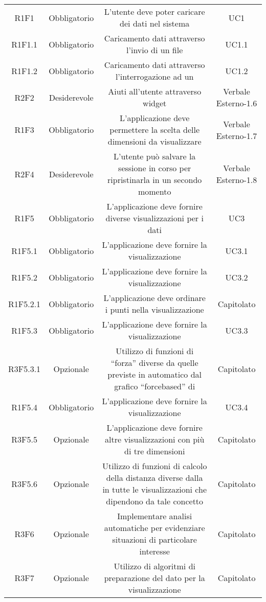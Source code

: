 \begin{center}
\begin{longtable}{C{\colA} C{\colB} C{\colC} C{\colA}}
R1F1 & Obbligatorio & L'utente deve poter caricare dei dati nel sistema & UC1\\
R1F1.1 & Obbligatorio & Caricamento dati attraverso l'invio di un file  & UC1.1\\
R1F1.2 & Obbligatorio & Caricamento dati attraverso l'interrogazione ad un  & UC1.2\\
R2F2 & Desiderevole & Aiuti all'utente attraverso widget & Verbale Esterno-1.6 \\
R1F3 & Obbligatorio & L'applicazione deve permettere la scelta delle dimensioni da visualizzare & Verbale Esterno-1.7\\
R2F4 & Desiderevole & L'utente può salvare la sessione in corso per ripristinarla in un secondo momento & Verbale Esterno-1.8\\
R1F5 & Obbligatorio & L'applicazione deve fornire diverse visualizzazioni per i dati & UC3\\
R1F5.1 & Obbligatorio & L'applicazione deve fornire la visualizzazione  & UC3.1\\
R1F5.2 & Obbligatorio & L'applicazione deve fornire la visualizzazione  & UC3.2\\
R1F5.2.1 & Obbligatorio & L'applicazione deve ordinare i punti nella visualizzazione  & Capitolato \\
R1F5.3 & Obbligatorio & L'applicazione deve fornire la visualizzazione  & UC3.3\\
R3F5.3.1 & Opzionale & Utilizzo di funzioni di “forza” diverse da quelle previste in automatico dal grafico “forcebased” di  & Capitolato\\
R1F5.4 & Obbligatorio & L'applicazione deve fornire la visualizzazione  & UC3.4 \\
R3F5.5 & Opzionale & L'applicazione deve fornire altre visualizzazioni con più di tre dimensioni & Capitolato\\
R3F5.6 & Opzionale & Utilizzo di funzioni di calcolo della distanza diverse dalla  in tutte le visualizzazioni che dipendono da tale concetto & Capitolato \\
R3F6 & Opzionale & Implementare analisi automatiche per evidenziare situazioni di particolare interesse & Capitolato\\
R3F7 & Opzionale & Utilizzo di algoritmi di preparazione del dato per la visualizzazione & Capitolato\\

\end{longtable}
\end{center}
